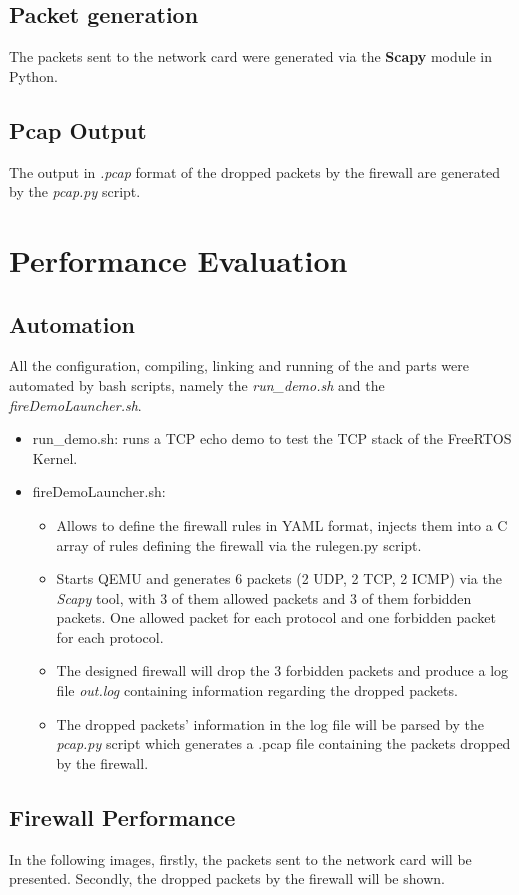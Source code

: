 \documentclass{exam}
\begin{document}
\subsection{Packet generation}
The packets sent to the network card were generated via the \textbf{Scapy} module in Python.
\subsection{Pcap Output}
The output in \textit{.pcap} format of the dropped packets by the firewall are generated by the \textit{pcap.py} script.
\pagebreak
\section{Performance Evaluation}
\subsection{Automation}
All the configuration, compiling, linking and running of the  and  parts were automated by bash scripts, namely the \textit{run\_demo.sh} and the \textit{fireDemoLauncher.sh}.
\begin{itemize}
    \item run\_demo.sh: runs a TCP echo demo to test the TCP stack of the FreeRTOS Kernel.
    \item fireDemoLauncher.sh: 
        \begin{itemize}
            \item Allows to define the firewall rules in YAML format, injects them into a C array of rules defining the firewall via the rulegen.py script.
            \item Starts QEMU and generates 6 packets (2 UDP, 2 TCP, 2 ICMP) via the \textit{Scapy} tool, with 3 of them allowed packets and 3 of them forbidden packets. One allowed packet for each protocol and one forbidden packet for each protocol.
            \item The designed firewall will drop the 3 forbidden packets and produce a log file \textit{out.log} containing information regarding the dropped packets.
            \item The dropped packets' information in the log file will be parsed by the \textit{pcap.py} script which generates a .pcap file containing the packets dropped by the firewall.
        \end{itemize}
    \end{itemize}
\subsection{Firewall Performance}
In the following images, firstly, the packets sent to the network card will be presented. Secondly, the dropped packets by the firewall will be shown.
\end{document}

